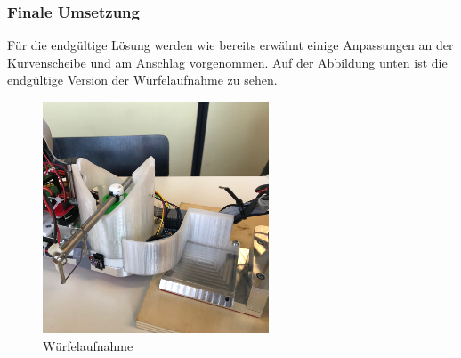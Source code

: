 \documentclass[../../main.tex]{subfiles}
\begin{document}
        
        \subsubsection{Finale Umsetzung}
        Für die endgültige Lösung werden wie bereits erwähnt einige Anpassungen an der Kurvenscheibe und am Anschlag vorgenommen. Auf der Abbildung unten ist die endgültige Version der Würfelaufnahme zu sehen. 

        \vspace{1.5cm}

        \begin{figure}[H]
            \centering
            \includegraphics[width=0.6\textwidth]{Finale_loesung.JPG}
            \caption {Würfelaufnahme}
        \end{figure}

    \pagebreak
\end{document}
